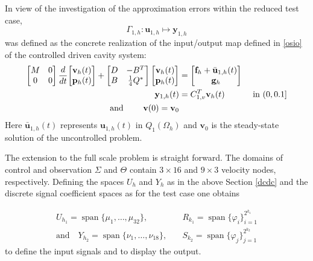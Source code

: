 \documentclass[a4paper,10pt,BCOR=15mm]{scrbook}
\DeclareMathOperator{\spann}{span}
\begin{document}
In view of the investigation of the approximation errors within the reduced test case,
\begin{equation*}
 \Gamma _{1,h}:\mathbf u_{1,h} \mapsto \mathbf y_{1,h}
\end{equation*}
was defined as the concrete realization of the input/output map defined in \eqref{osio} of the controlled driven cavity system:
\begin{align}\label{testcase1}
	\begin{bmatrix} M& 0 \\ 0& 0 \end{bmatrix} \frac{d}{dt} {\begin{bmatrix} \mathbf v_h(t) \\ \mathbf p_h(t)  \end{bmatrix}} + \begin{bmatrix} D& -B^T \\  B& \frac{1}{4}Q^* \end{bmatrix} \begin{bmatrix} \mathbf v_h(t) \\ \mathbf p_h(t)  \end{bmatrix} &= \begin{bmatrix} \mathbf f_h + \bar {\mathbf u}_{1,h}(t) \\ \mathbf g_h \end{bmatrix} \\
\mathbf y_{1,h}(t) &= C_{1,v}^T \mathbf v_h(t)\quad \quad \quad \text{ in $(0,0.1]$} \notag\\
\text{and  }\quad \quad \mathbf v(0) = \mathbf v_0& \notag
\end{align}
Here $\bar {\mathbf u}_{1,h}(t)$ represents $\mathbf u_{1,h}(t)$ in $Q_1(\Omega_h)$ and $ \mathbf v_0$ is the steady-state solution of the uncontrolled problem.

The extension to the full scale problem is straight forward. The domains of control and observation $\Sigma$ and $\Theta$ contain $3 \times 16$ and $9 \times 3$ velocity nodes, respectively. Defining the spaces $U_h$ and $Y_h$ as in the above Section \ref{dcdc} and the discrete signal coefficient spaces as for the test case one obtains

 \begin{subequations}
 \begin{align*}
  U_{h_1} = \spann \bigl\{ \mu_1,\dots,\mu_{32} \bigr\}, &\quad R_{k_1} = \spann \bigl \{ \varphi_i \bigr \}^{2^{k_1}}_{i=1}\\
\text{and} \quad
 Y_{h_2} = \spann\bigl \{ \nu_1,\dots,\nu_{18} \bigr\}, & \quad S_{k_2} = \spann\bigl \{ \varphi_j \bigr \}^{2^{k_2}}_{j=1}
 \end{align*}
\end{subequations}
to define the input signals and to display the output.
\end{document}
